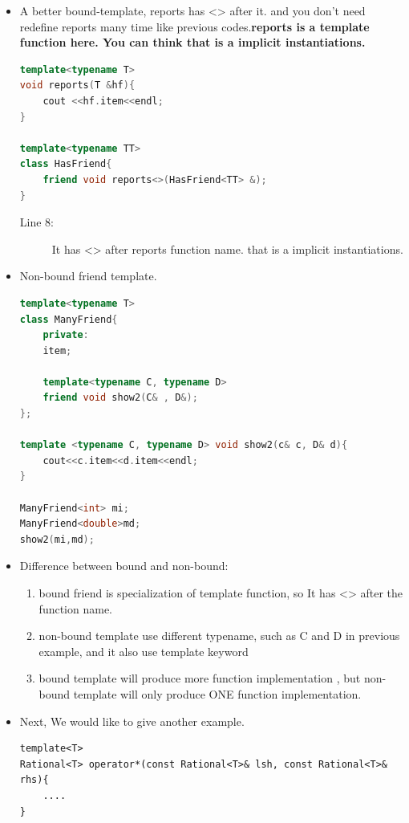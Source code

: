 \documentclass[a4paper,11pt,twoside]{book}
\begin{document}
\begin{itemize}
	\item A better bound-template, reports has <> after it.  and you don't need redefine reports many time like previous codes.\textbf{reports is a template function here. You can think that is a implicit instantiations. }
\begin{lstlisting}[frame=single, language=c++]
template<typename T>
void reports(T &hf){
	cout <<hf.item<<endl;
}

template<typename TT>
class HasFriend{
	friend void reports<>(HasFriend<TT> &);
}	
\end{lstlisting}	
	\begin{description}
		\item[Line 8:] It has <> after reports function name. that is a implicit instantiations.
	\end{description}
	
	\item Non-bound friend template.
\begin{lstlisting}[frame=single, language=c++]
template<typename T>
class ManyFriend{
	private:
	item;
	
	template<typename C, typename D>
	friend void show2(C& , D&);
};

template <typename C, typename D> void show2(c& c, D& d){
	cout<<c.item<<d.item<<endl;
}

ManyFriend<int> mi;
ManyFriend<double>md;
show2(mi,md);	
\end{lstlisting}	
	
	\item Difference between bound and non-bound:
	
	\begin{enumerate}
		\item bound friend is specialization of template function, so It has <> after the function name.
		
		\item non-bound template use different typename, such as C and D in previous example, and it also use template keyword
		
		\item bound template will produce more function implementation , but non-bound template will only produce ONE function implementation.
	\end{enumerate}
	
	\item Next, We would like to give another example.
\begin{lstlisting}
template<T>
Rational<T> operator*(const Rational<T>& lsh, const Rational<T>& rhs){
	....
}


\end{lstlisting}
\end{itemize}
\end{document}
